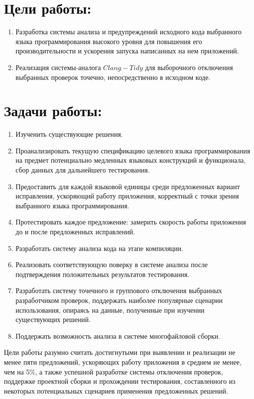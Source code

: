 \documentclass{mipt-thesis-bs}
\begin{document}
\section{Цели работы:}

\begin{enumerate}
    \item Разработка системы анализа и предупреждений исходного кода выбранного языка программирования высокого уровня 
для повышения его производительности и ускорения запуска написанных на нем приложений.
    \item Реализация системы-аналога $Clang-Tidy$ для выборочного отключения выбранных проверок точечно, непосредственно в исходном коде.
\end{enumerate}

\section{Задачи работы:}

\begin{enumerate}
    \item Изученить существующие решения.
    \item Проанализировать текущую спецификацию целевого языка программирования на предмет потенциально медленных языковых конструкций и функционала,
    сбор данных для дальнейшего тестирования.
    \item Предоставить для каждой языковой единицы среди предложенных вариант исправления, ускоряющий работу приложения, корректный с точки
    зрения выбранного языка программирования.
    \item Протестировать каждое предложение: замерить скорость работы приложения до и после предложенных исправлений.
    \item Разработать систему анализа кода на этапе компиляции.
    \item Реализовать соответствующую поверку в системе анализа после подтверждения положительных результатов тестирования.
    \item Разработать систему точечного и группового отключения выбранных разработчиком проверок, поддержать наиболее популярные сценарии 
    использования, опираясь на данные, полученные при изучении существующих решений.
    \item Поддержать возможность анализа в системе многофайловой сборки.

\end{enumerate}

Цели работы разумно считать достигнутыми при выявлении и реализации не менее пяти предложений,
ускоряющих работу приложения в среднем не менее, чем на 5\%,
а также успешной разработке системы отключения проверок, поддержке проектной сборки и прохождении тестирования, составленного из некоторых
потенциальных сценариев применения предложенных решений.
\end{document}
